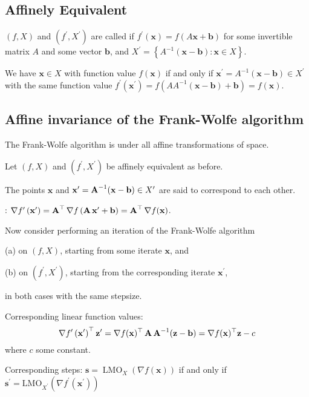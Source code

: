 \subsection*{Affinely Equivalent}
$(f, X)$ and $\left(f^{\prime}, X^{\prime}\right)$ are called  if $f^{\prime}(\mathbf{x})=f(A \mathbf{x}+\mathbf{b})$ for some invertible matrix $A$ and some vector $\mathbf{b}$, and $X^{\prime}=\left\{A^{-1}(\mathbf{x}-\mathbf{b}): \mathbf{x} \in X\right\}$.

We have $\mathbf{x} \in X$ with function value $f(\mathbf{x})$ if and only if $\mathbf{x}^{\prime}=A^{-1}(\mathbf{x}-\mathbf{b}) \in X^{\prime}$ with the same function value $f^{\prime}\left(\mathbf{x}^{\prime}\right)=f\left(A A^{-1}(\mathbf{x}-\mathbf{b})+\mathbf{b}\right)=f(\mathbf{x})$.







\subsection*{Affine invariance of the Frank-Wolfe algorithm}
The Frank-Wolfe algorithm is  under all affine transformations of space.

Let $(f, X)$ and $\left(f^{\prime}, X^{\prime}\right)$ be affinely equivalent as before.

The points $\mathbf{x}$ and $\mathbf{x}^{\prime}=\operatorname{\boldsymbol{\mathbf{A}}}^{-1}(\mathbf{x}-\mathbf{b}) \in X^{\prime}$ are said to correspond to each other.

: $\nabla f^{\prime}\left(\mathbf{x}^{\prime}\right)=\operatorname{\boldsymbol{\mathbf{A}}}^{\top} \nabla f\left(\operatorname{\boldsymbol{\mathbf{A}}} \mathbf{x}^{\prime}+\mathbf{b}\right)=\operatorname{\boldsymbol{\mathbf{A}}}^{\top} \nabla f(\mathbf{x})$.

Now consider performing an iteration of the Frank-Wolfe algorithm

(a) on $(f, X)$, starting from some iterate $\mathbf{x}$, and

(b) on $\left(f^{\prime}, X^{\prime}\right)$, starting from the corresponding iterate $\mathbf{x}^{\prime}$,

in both cases with the same stepsize.

Corresponding linear function values:
$$
\nabla f^{\prime}\left(\mathbf{x}^{\prime}\right)^{\top} \mathbf{z}^{\prime}=\nabla f(\mathbf{x})^{\top} \operatorname{\boldsymbol{\mathbf{A}}} \operatorname{\boldsymbol{\mathbf{A}}}^{-1}(\mathbf{z}-\mathbf{b})=\nabla f(\mathbf{x})^{\top} \mathbf{z}-c
$$
where $c$ some constant.

Corresponding steps: $\mathbf{s}=\operatorname{LMO}_{X}(\nabla f(\mathbf{x}))$ if and only if $\mathbf{s}^{\prime}=\mathrm{LMO}_{X^{\prime}}\left(\nabla f^{\prime}\left(\mathbf{x}^{\prime}\right)\right)$






